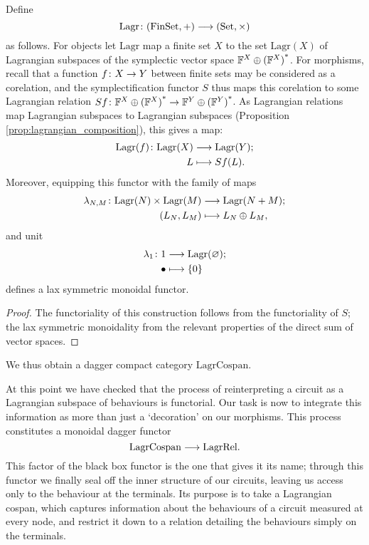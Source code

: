 \begin{proposition}
Define 
\[
  \mathrm{Lagr}{\colon} (\mathrm{FinSet},+) \longrightarrow (\mathrm{Set},\times)
\]
as follows. For objects let $\mathrm{Lagr}$ map a finite set $X$ to the set
$\mathrm{Lagr}(X)$ of Lagrangian subspaces of the symplectic vector space
${{\mathbb F}^{X} \oplus {({\mathbb F}^{X})}^\ast}$.  For morphisms, recall that a function $f{\colon} X \to Y$ between
finite sets may be considered as a corelation, and the symplectification functor
$S$ thus maps this corelation to some Lagrangian relation $Sf{\colon} {{\mathbb F}^{X} \oplus {({\mathbb F}^{X})}^\ast}
\to {{\mathbb F}^{Y} \oplus {({\mathbb F}^{Y})}^\ast}$. As Lagrangian relations map Lagrangian subspaces to Lagrangian
subspaces (Proposition \ref{prop:lagrangian_composition}), this gives a map: 
\begin{align*}
  \mathrm{Lagr}(f){\colon} \mathrm{Lagr}(X) &\longrightarrow \mathrm{Lagr}(Y); \\
  L &\longmapsto Sf(L).
\end{align*}
Moreover, equipping this functor with the family of maps
\begin{align*}
  \lambda_{N,M}{\colon} \mathrm{Lagr}(N) \times \mathrm{Lagr}(M) &\longrightarrow
  \mathrm{Lagr}(N+M);\\
  (L_N,L_M) &\longmapsto L_N \oplus L_M,
\end{align*}
and unit
\begin{align*}
  \lambda_1{\colon} 1 &\longrightarrow \mathrm{Lagr}(\varnothing);\\
  \bullet &\longmapsto \{0\}
\end{align*}
defines a lax symmetric monoidal functor.
\end{proposition}
\begin{proof}
  The functoriality of this construction follows from the functoriality of $S$;
  the lax symmetric monoidality from the relevant properties of the direct sum
  of vector spaces.
\end{proof}
We thus obtain a dagger compact category $\mathrm{LagrCospan}$.

At this point we have checked that the process of reinterpreting a circuit as a
Lagrangian subspace of behaviours is functorial. Our task is now to integrate
this information as more than just a `decoration' on our morphisms. This process
constitutes a monoidal dagger functor
\[
  \mathrm{LagrCospan} \longrightarrow \mathrm{LagrRel}.
\]
This factor of the black box functor is the one that gives it its name;
through this functor we finally seal off the inner structure of our circuits,
leaving us access only to the behaviour at the terminals. Its purpose is to take a 
Lagrangian cospan, which captures information about the behaviours of a 
circuit measured at every node, and restrict it down to a 
relation detailing the behaviours simply on the terminals. 

